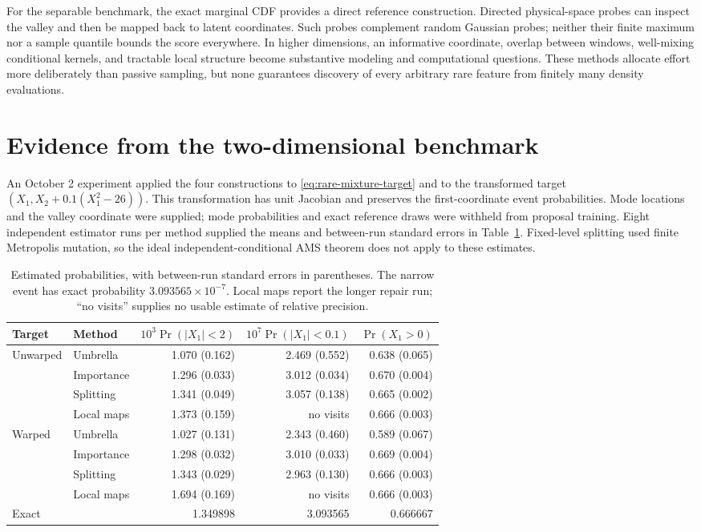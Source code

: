 For the separable benchmark, the exact marginal CDF provides a direct
reference construction. Directed physical-space probes can inspect the valley
and then be mapped back to latent coordinates. Such probes complement random
Gaussian probes; neither their finite maximum nor a sample quantile bounds
the score everywhere. In higher dimensions, an informative coordinate,
overlap between windows, well-mixing conditional kernels, and tractable local
structure become substantive modeling and computational questions. These
methods allocate effort more deliberately than passive sampling, but none
guarantees discovery of every arbitrary rare feature from finitely many
density evaluations.

\section[Two-dimensional sampling evidence]{Evidence from the two-dimensional benchmark}

An October 2 experiment applied the four constructions to
\eqref{eq:rare-mixture-target} and to the transformed target
$(X_1,X_2+0.1(X_1^2-26))$. This transformation has unit Jacobian and
preserves the first-coordinate event probabilities. Mode locations and the
valley coordinate were supplied; mode probabilities and exact reference draws
were withheld from proposal training. Eight independent estimator runs per
method supplied the means and between-run standard errors in
Table~\ref{tab:rare-region-estimation}. Fixed-level splitting used finite
Metropolis mutation, so the ideal independent-conditional AMS theorem does
not apply to these estimates.

\begin{table}[htbp]
 \centering\small
 \caption{Estimated probabilities, with between-run standard errors in
 parentheses. The narrow event has exact probability
 $3.093565\times10^{-7}$. Local maps report the longer repair run;
 ``no visits'' supplies no usable estimate of relative precision.}
 \label{tab:rare-region-estimation}
 \begin{tabular}{llrrr}
 \hline
 Target & Method & $10^3\Pr(|X_1|<2)$ & $10^7\Pr(|X_1|<0.1)$ & $\Pr(X_1>0)$\\
 \hline
 Unwarped & Umbrella & 1.070 (0.162) & 2.469 (0.552) & 0.638 (0.065)\\
 & Importance & 1.296 (0.033) & 3.012 (0.034) & 0.670 (0.004)\\
 & Splitting & 1.341 (0.049) & 3.057 (0.138) & 0.665 (0.002)\\
 & Local maps & 1.373 (0.159) & no visits & 0.666 (0.003)\\
 Warped & Umbrella & 1.027 (0.131) & 2.343 (0.460) & 0.589 (0.067)\\
 & Importance & 1.298 (0.032) & 3.010 (0.033) & 0.669 (0.004)\\
 & Splitting & 1.343 (0.029) & 2.963 (0.130) & 0.666 (0.003)\\
 & Local maps & 1.694 (0.169) & no visits & 0.666 (0.003)\\
 \hline
 Exact & & 1.349898 & 3.093565 & 0.666667\\
 \hline
 \end{tabular}
\end{table}

